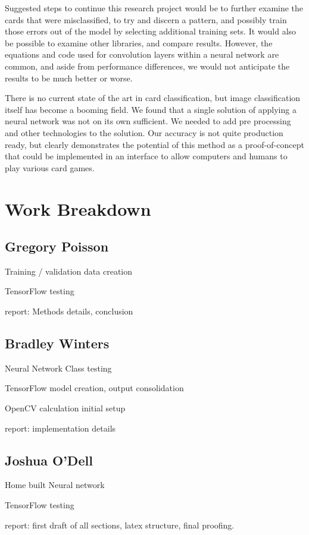 \documentclass[letterpaper]{article}
\begin{document}
Suggested steps to continue this research project would be to further examine the cards that were misclassified, to try and discern a pattern, and possibly train those errors out of the model by selecting additional training sets.  It would also be possible to examine other libraries, and compare results.  However, the equations and code used for convolution layers within a neural network are common, and aside from performance differences, we would not anticipate the results to be much better or worse.

There is no current state of the art in card classification, but image classification itself has become a booming field.  We found that a single solution of applying a neural network was not on its own sufficient.  We needed to add pre processing and other technologies to the solution.  Our accuracy is not quite production ready, but clearly demonstrates the potential of this method as a proof-of-concept that could be implemented in an interface to allow computers and humans to play various card games.


\nocite{*}



\section{Work Breakdown}

\subsection{Gregory Poisson}

Training / validation data creation

TensorFlow testing

report: Methods details, conclusion

\subsection{Bradley Winters}

Neural Network Class testing

TensorFlow model creation, output consolidation

OpenCV calculation initial setup

report: implementation details

\subsection{Joshua O'Dell}

Home built Neural network

TensorFlow testing

report: first draft of all sections, latex structure, final proofing.
\end{document}
